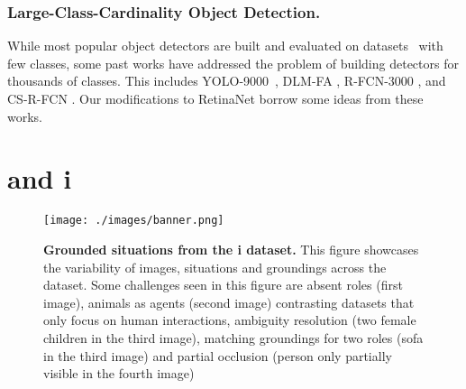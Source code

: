 \documentclass[runningheads]{llncs}
\newcommand{\dataset}{\mbox{\sc{SW}}i\mbox{\sc{G}}\xspace}
\newcommand{\tasksmall}{\mbox{\sc{GSR}}\xspace}
\begin{document}
\vspace{-5mm}
\subsubsection{Large-Class-Cardinality Object Detection. } 
While most popular object detectors are built and evaluated on datasets~\cite{Lin2014MicrosoftCC,Everingham2009ThePV} with few classes, some past works have addressed the problem of building detectors for thousands of classes. This includes YOLO-9000~\cite{yolo}, DLM-FA \cite{Yang2019Detecting1C}, R-FCN-3000 \cite{Singh2017RFCN3000A3}, and CS-R-FCN \cite{GuoLiAndWang2020}. Our modifications to RetinaNet borrow some ideas from these works.













 
\section{\tasksmall and \dataset{}}

\vspace{-10mm}
\begin{figure}
\centering
\texttt{[image: ./images/banner.png]}
\vspace{-1em}
\caption{\textbf{Grounded situations from the \dataset{} dataset.} This figure showcases the variability of images, situations and groundings across the dataset. Some challenges seen in this figure are absent roles (first image), animals as agents (second image) contrasting datasets that only focus on human interactions, ambiguity resolution (two female children in the third image), matching groundings for two roles (sofa in the third image) and partial occlusion (person only partially visible in the fourth image)}
\label{fig:teaser2}
\end{figure}
\vspace{-3em}
\end{document}
